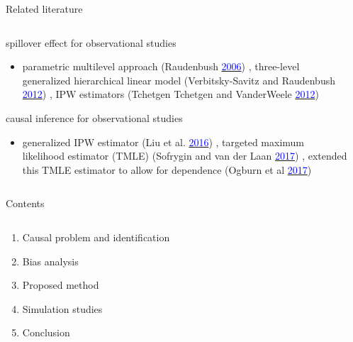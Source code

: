 \documentclass[notes,11pt, aspectratio=169]{beamer}
\begin{document}
\begin{frame}{Related literature}
\begin{columns}[T] %
\begin{column}{0.95\textwidth}
  \begin{wideitemize}
  \item spillover effect for observational studies 
  \begin{itemize}
      \item parametric multilevel approach (Raudenbush \href{https://www.tandfonline.com/doi/abs/10.1198/016214506000000447}{\textcolor{blue}{2006}}) , three-level generalized hierarchical linear model (Verbitsky-Savitz and Raudenbush \href{https://www.degruyter.com/document/doi/10.1515/2161-962X.1020/html?lang=en}{\textcolor{blue}{2012}}) , IPW estimators (Tchetgen Tchetgen and VanderWeele \href{https://www.ncbi.nlm.nih.gov/pmc/articles/PMC4216807/}{\textcolor{blue}{2012}})
  \end{itemize} 
  \item causal inference for observational studies
  \begin{itemize}
     \item generalized IPW estimator  (Liu et al. \href{https://www.ncbi.nlm.nih.gov/pmc/articles/PMC5793685/}{\textcolor{blue}{2016}}) , targeted maximum likelihood estimator (TMLE) (Sofrygin and van der Laan  \href{https://www.ncbi.nlm.nih.gov/pmc/articles/PMC5650205/}{\textcolor{blue}{2017}}) , extended this TMLE estimator to allow for dependence (Ogburn et al \href{https://arxiv.org/abs/1705.08527}{\textcolor{blue}{2017}})
  \end{itemize}
  \end{wideitemize}
\end{column}%
\hfill%
\begin{column}{.38\textwidth}

\end{column}%
\end{columns}
\end{frame}













\begin{frame}{Contents}
\begin{columns}[T] %
\begin{column}{.8\textwidth}
  \begin{enumerate}[{Part} I.]
    \item Causal problem and identification
    \item Bias analysis
    \item Proposed method
    \item Simulation studies
    \item Conclusion
  \end{enumerate}
\end{column}
\end{columns}
\end{frame}
\end{document}
